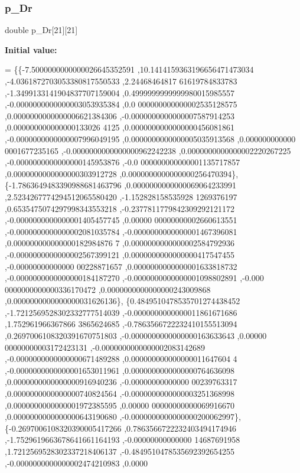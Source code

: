 \subsubsection{\texorpdfstring{p\+\_\+\+Dr}{p\_Dr}}
{\footnotesize\ttfamily double p\+\_\+\+Dr\mbox{[}21\mbox{]}\mbox{[}21\mbox{]}}

{\bfseries Initial value\+:}
\begin{DoxyCode}
= \{\{-7.5000000000000026645352591 ,10.1414159363196656471473034 ,-4.0361872703053380817550533 ,2.24468464817
      61619784833783 ,-1.3499133141904837707159004 ,0.4999999999999980015985557 ,-0.0000000000000003053935384 ,0.0
      000000000000002535128575 ,0.0000000000000006621384306 ,-0.0000000000000007587914253 ,0.000000000000000133026
      4125 ,0.0000000000000000456081861 ,-0.0000000000000007996049195 ,0.0000000000000005035913568 ,0.000000000000
      0001677235165 ,-0.0000000000000000962242238 ,0.0000000000000002220267225 ,-0.0000000000000000145953876 ,-0.0
      000000000000001135717857 ,0.0000000000000000303912728 ,0.0000000000000000256470394\},
\{-1.7863649483390988681463796 ,0.0000000000000069064233991 ,2.5234267774294512065580420 ,-1.152828158535928
      1269376197 ,0.6535475074297998343553218 ,-0.2377811779842309292121172 ,-0.0000000000000001405457745 ,0.00000
      00000000002660613551 ,-0.0000000000000002081035784 ,-0.0000000000000001467396081 ,0.000000000000000182984876
      7 ,0.0000000000000002584792936 ,-0.0000000000000002567399121 ,0.0000000000000000417547455 ,-0.00000000000000
      00228871657 ,0.0000000000000001633818732 ,-0.0000000000000000184187270 ,-0.0000000000000001098802891 ,-0.000
      0000000000000336170472 ,0.0000000000000000243009868 ,0.0000000000000000031626136\},
\{0.4849510478535701274438452 ,-1.7212569528302332777514039 ,-0.0000000000000011861671686 ,1.752961966367866
      3865624685 ,-0.7863566722232410155513094 ,0.2697006108320391670751803 ,-0.0000000000000000163633643 ,0.00000
      00000000003172423131 ,-0.0000000000000002083142689 ,-0.0000000000000000671489288 ,0.000000000000000011647604
      4 ,-0.0000000000000001653011961 ,0.0000000000000000764636098 ,0.0000000000000000916940236 ,-0.00000000000000
      00239763317 ,0.0000000000000000740824564 ,-0.0000000000000003251368998 ,0.0000000000000001972385595 ,0.00000
      00000000000069916670 ,0.0000000000000000643190680 ,-0.0000000000000000200062997\},
\{-0.2697006108320390005417266 ,0.7863566722232403494174946 ,-1.7529619663678641661164193 ,-0.00000000000000
      14687691958 ,1.7212569528302337218406137 ,-0.4849510478535692392654255 ,-0.0000000000000002474210983 ,0.0000

\end{DoxyCode}
